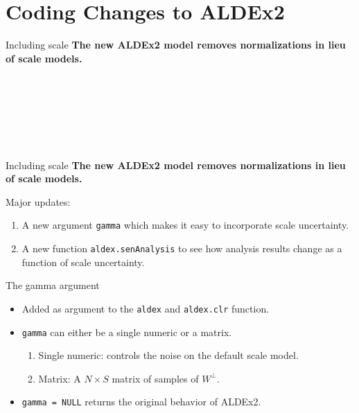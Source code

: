 \documentclass[
  ignorenonframetext,
]{beamer}
\providecommand{\tightlist}{%
  \setlength{\itemsep}{0pt}\setlength{\parskip}{0pt}}
\begin{document}
\hypertarget{coding-changes-to-aldex2}{%
\section{Coding Changes to ALDEx2}\label{coding-changes-to-aldex2}}

\begin{frame}{Including scale}
\protect\hypertarget{including-scale}{}
\textbf{The new ALDEx2 model removes normalizations in lieu of scale
models.}

\vspace{.25in}

\textcolor{white}{Major updates:}

\textcolor{white}{1. A new argument `gamma` which makes it easy to incorporate scale uncertainty.}

\textcolor{white}{2. A new function `aldex.senAnalysis` to see how analysis results change as a function of scale uncertainty.}
\end{frame}

\begin{frame}[fragile]{Including scale}
\protect\hypertarget{including-scale-1}{}
\textbf{The new ALDEx2 model removes normalizations in lieu of scale
models.}

\vspace{.25in}

Major updates:

\begin{enumerate}
\item
  A new argument \texttt{gamma} which makes it easy to incorporate scale
  uncertainty.
\item
  A new function \texttt{aldex.senAnalysis} to see how analysis results
  change as a function of scale uncertainty.
\end{enumerate}
\end{frame}

\begin{frame}[fragile]{The gamma argument}
\protect\hypertarget{the-gamma-argument}{}
\begin{itemize}
\item
  Added as argument to the \texttt{aldex} and \texttt{aldex.clr}
  function.
\item
  \texttt{gamma} can either be a single numeric or a matrix.

  \begin{enumerate}
  \tightlist
  \item
    Single numeric: controls the noise on the default scale model.
  \item
    Matrix: A \(N \times S\) matrix of samples of \(W^\perp\).
  \end{enumerate}
\item
  \texttt{gamma\ =\ NULL} returns the original behavior of ALDEx2.
\end{itemize}
\end{frame}
\end{document}
